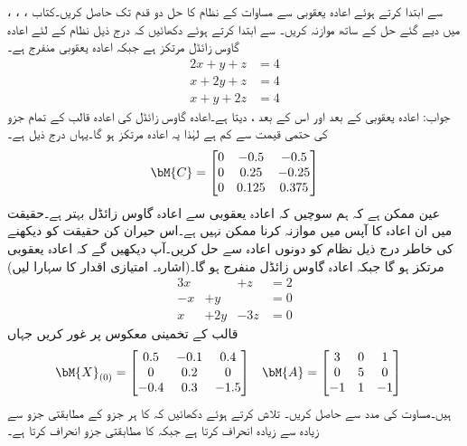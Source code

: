 \quad
{}، ، ،  سے ابتدا کرتے ہوئے اعادہ یعقوبی سے مساوات  کے نظام  کا حل دو قدم تک حاصل کریں۔کتاب میں دیے گئے حل کے ساتھ موازنہ کریں۔
\quad
{} سے ابتدا کرتے ہوئے دکھائیں کہ درج ذیل نظام کے لئے اعادہ گاوس زائڈل مرتکز ہے جبکہ اعادہ یعقوبی منفرج ہے۔
\begin{align*}
2x+y+z&=4\\
x+2y+z&=4\\
x+y+2z&=4
\end{align*}
جواب:\quad
اعادہ یعقوبی  کے بعد  اور اس کے بعد ،  دیتا ہے۔اعادہ گاوس زائڈل کی اعادہ قالب  کے تمام جزو کی حتمی قیمت  سے کم ہے لہٰذا یہ اعادہ مرتکز ہو گا۔یہاں  درج ذیل ہے۔
\begin{align*}
\bM{C}=
\begin{bmatrix}
0&-0.5&-0.5\\
0&0.25&-0.25\\
0&0.125&0.375
\end{bmatrix}
\end{align*}
\quad
عین ممکن ہے کہ ہم سوچیں کہ اعادہ یعقوبی سے  اعادہ گاوس زائڈل بہتر ہے۔حقیقت میں ان اعادہ کا آپس میں موازنہ کرنا ممکن نہیں ہے۔اس حیران کن حقیقت کو دیکھنے کی خاطر درج ذیل نظام کو دونوں اعادہ سے حل کریں۔آپ دیکھیں گے کہ اعادہ یعقوبی مرتکز ہو گا جبکہ اعادہ گاوس زائڈل منفرج ہو گا۔(اشارہ۔ امتیازی اقدار کا سہارا لیں)
\begin{alignat*}{3}
x&{}&+z&=2\\
-x&+y&{}&=0\\
x&+2y&-3z&=0
\end{alignat*}  
\quad
قالب  کے  تخمینی معکوس  پر غور کریں جہاں
\begin{align*}
\bM{X}_{(0)}&=\begin{bmatrix} 0.5&-0.1&0.4\\0&0.2&0\\-0.4&0.3&-1.5 \end{bmatrix} & \bM{A}&=
\begin{bmatrix}
3&0&1\\0&5&0\\-1&1&-1
\end{bmatrix}
\end{align*}
ہیں۔مساوت  کی مدد سے  حاصل کریں۔ تلاش کرتے ہوئے دکھائیں کہ  کا ہر جزو  کے مطابقتی جزو سے زیادہ سے زیادہ  انحراف کرتا ہے جبکہ  کا مطابقتی جزو   انحراف کرتا ہے۔\\
